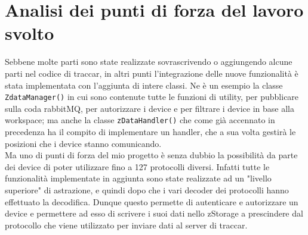 \documentclass[a4paper,titlepage,12pt]{book}
\begin{document}
{\section{
Analisi dei punti di forza del lavoro svolto}
Sebbene molte parti sono state realizzate sovrascrivendo o aggiungendo alcune parti nel codice di traccar, in altri punti  l'integrazione delle nuove funzionalità è stata implementata con l'aggiunta di intere classi. Ne è un esempio la classe \texttt{ZdataManager()} in cui sono contenute tutte le funzioni di utility, per pubblicare sulla coda rabbitMQ, per autorizzare i device e per filtrare i device in base alla workspace; ma anche la classe \texttt{zDataHandler()}  che come già accennato in precedenza ha il compito di implementare un handler, che a sua volta gestirà le posizioni che i device stanno comunicando.\\
Ma uno di punti di forza del mio progetto è senza dubbio la possibilità da parte dei device di poter utilizzare fino a 127 protocolli diversi. Infatti tutte le funzionalità implementate in aggiunta sono state realizzate ad un "livello superiore" di astrazione, e quindi dopo che i vari decoder dei protocolli hanno effettuato la decodifica. Dunque questo permette di autenticare e autorizzare un device e permettere ad esso di scrivere i suoi dati nello zStorage a prescindere dal protocollo che viene utilizzato per inviare dati al server di traccar.

}
\end{document}
